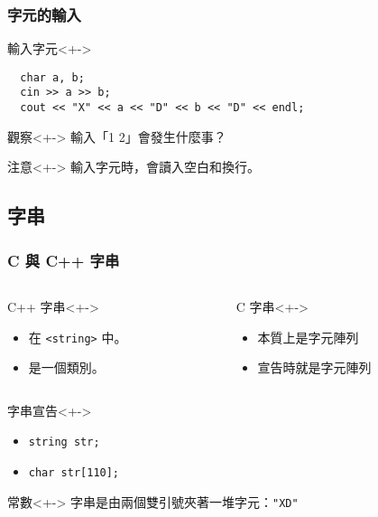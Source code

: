 \documentclass[utf8]{beamer}
\begin{document}
\begin{CJK}{UTF8}{bkai}
\begin{frame}[fragile]
  \frametitle{字元的輸入}
  \begin{block}{輸入字元}<+->
    \begin{lstlisting}
  char a, b;
  cin >> a >> b;
  cout << "X" << a << "D" << b << "D" << endl;
    \end{lstlisting}
  \end{block}
  \begin{exampleblock}{觀察}<+->
  輸入「1 2」會發生什麼事？
  \end{exampleblock}
  \begin{alertblock}{注意}<+->
  輸入字元時，會讀入\alert{空白}和\alert{換行}。
  \end{alertblock}
\end{frame}

\subsection{字串}

\begin{frame}[fragile]
  \frametitle{C 與 C++ 字串}
  \begin{columns}[T]
    \begin{column}[T]{5.5cm}
    \begin{block}{C++ 字串}<+->
      \begin{itemize}[<+->]
      \item 在 \lstinline{<string>}{} 中。
      \item 是一個類別。
      \end{itemize}
    \end{block}
    \end{column}
    \begin{column}[T]{5.5cm}
    \begin{exampleblock}{C 字串}<+->
      \begin{itemize}
      \item 本質上是字元陣列
      \item<+-> 宣告時就是字元陣列
      \end{itemize}
    \end{exampleblock}
    \end{column}
  \end{columns}
  \begin{alertblock}{字串宣告}<+->
    \begin{multicols}{2}
    \begin{itemize}[<+->]
      \item \lstinline{string str;}{}
      \item \lstinline{char str[110];}{}
    \end{itemize}
    \end{multicols}
  \end{alertblock}
  \begin{exampleblock}{常數}<+->
  字串是由兩個雙引號夾著一堆字元：\lstinline{"XD"}{}
  \end{exampleblock}
\end{frame}


\end{CJK}
\end{document}
